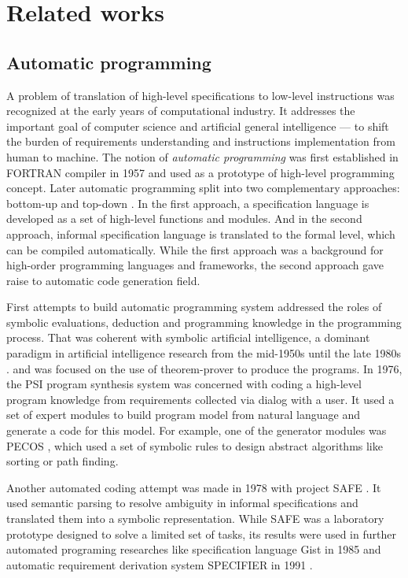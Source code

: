 \chapter{Related works}
\label{Chapter2}

\section{Automatic programming}
A problem of translation of high-level specifications to low-level instructions was recognized at the early years of computational industry. It addresses the important goal of computer science and artificial general intelligence --- to shift the burden of requirements understanding and instructions implementation from human to machine. The notion of \emph{automatic programming} was first established in FORTRAN compiler in 1957 \parencite{backus1957fortran} and used as a prototype of high-level programming concept.  Later automatic programming split into two complementary approaches: bottom-up and top-down \parencite{Balzer1985}. In the first approach, a specification language is developed as a set of high-level functions and modules. And in the second approach, informal specification language is translated to the formal level, which can be compiled automatically. While the first approach was a background for high-order programming languages and frameworks, the second approach gave raise to automatic code generation field. 

First attempts to build automatic programming system addressed the roles of symbolic evaluations, deduction and programming knowledge in the programming process. That was coherent with symbolic artificial intelligence, a dominant paradigm in artificial intelligence research from the mid-1950s until the late 1980s \parencite{haugeland1989artificial}. \cite{green1969application} and \cite{Lee1974} was focused on the use of theorem-prover to produce the programs. In 1976, the PSI program synthesis system \parencite{green1976design, green1977summary} was concerned with coding a high-level program knowledge from requirements collected via dialog with a user. It used a set of expert modules to build program model from natural language and generate a code for this model. For example, one of the generator modules was PECOS \parencite{barstow1979experiment}, which used a set of symbolic rules to design abstract algorithms like sorting or path finding. 

Another automated coding attempt was made in 1978 with project SAFE \parencite{balzer1978informality}. It used semantic parsing to resolve ambiguity in informal specifications and translated them into a symbolic representation. While SAFE was a laboratory prototype designed to solve a limited set of tasks, its results were used in further automated programing researches like specification language Gist \parencite{Balzer1985} in 1985 and automatic requirement derivation system SPECIFIER in 1991 \parencite{Miriyala1991}.

